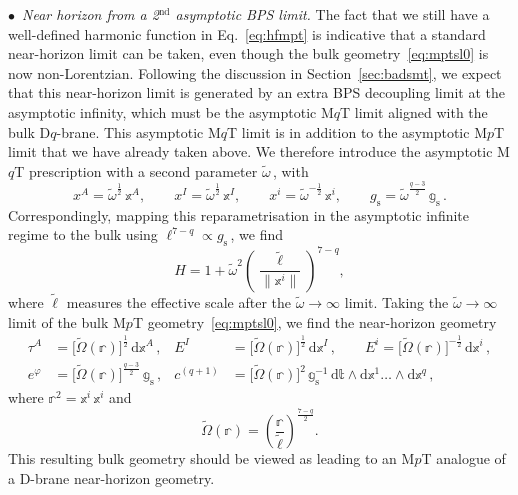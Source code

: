 \documentclass[11pt]{article}
\newcommand{\be}{\begin{equation}}
\newcommand{\ee}{\end{equation}}
\renewcommand{\tilde}[1]{\widetilde{#1}}
\renewcommand{\emph}[1]{\textit{#1}}
\newcommand{\dd}{\mathrm{d}}
\newcommand{\lbb}{\tilde{\ell}}
\begin{document}
\vspace{3mm}

\noindent $\bullet$~\emph{Near horizon from a 2${}^\text{nd}$ asymptotic BPS limit.} 
The fact that we still have a well-defined harmonic function in Eq.~\eqref{eq:hfmpt} is indicative that a standard near-horizon limit can be taken, even though the bulk geometry~\eqref{eq:mptsl0} is now non-Lorentzian. Following the discussion in Section~\ref{sec:badsmt}, we expect that this near-horizon limit is generated by an extra BPS decoupling limit at the asymptotic infinity, which must be the asymptotic M$q$T limit aligned with the bulk D$q$-brane.  
This asymptotic M$q$T limit is in addition to the asymptotic M$p$T limit that we have already taken above. We therefore introduce the asymptotic M$q$T prescription with a second parameter $\tilde{\omega}$\,, with %
\be
    x^A = \tilde{\omega}^{\frac{1}{2}} \, \mathbb{x}^A,
        \qquad%
    x^I = \tilde{\omega}^{\frac{1}{2}} \, \mathbb{x}^I,
        \qquad%
    x^i = \tilde{\omega}^{-\frac{1}{2}} \, \mathbb{x}^i,
        \qquad%
    g^{}_\text{s} = \tilde{\omega}^{\frac{q -3}{2}} \, \mathbb{g}^{}_\text{s}\,.
\ee
Correspondingly, mapping this reparametrisation in the asymptotic infinite regime to the bulk using $\ell^{7 - q} \propto g^{}_\text{s}$\,, we find
%
\be
    H = 1 + \tilde{\omega}^2 \left( \frac{\lbb}{\|\mathbb{x}^i \|} \right)^{\!7-q}\!\!,
\ee
%
where $\lbb$ measures the effective scale after the $\tilde{\omega} \rightarrow \infty$ limit. 
Taking the $\tilde{\omega} \rightarrow \infty$ limit of the bulk M$p$T geometry~\eqref{eq:mptsl0}, we find the near-horizon geometry
%
\begin{subequations} \label{eq:mptsl0NH}
\begin{align} 
    \tau^{A} & = \bigl[ \tilde{\mathbb{\Omega}} (\mathbb{r}) \bigr]^\frac{1}{2} \, \dd \mathbb{x}^A \,,
        &%
    E^{I} & = \bigl[\tilde{\mathbb{\Omega}} (\mathbb{r})\bigr]^{\frac{1}{2}} \, \dd \mathbb{x}^{I} \,,
        \qquad%
    E^{i} = \bigl[ \tilde{\mathbb{\Omega}} (\mathbb{r}) \bigr]^{-\frac{1}{2}} \, \dd \mathbb{x}^{i} \,,\\[4pt]
    e^{\varphi} & = \bigl[ \tilde{\mathbb{\Omega}} (\mathbb{r}) \bigr]^{\frac{q-3}{2}} \, \mathbb{g}_\text{s} \,,
        &%
    c^{(q+1)} & = \bigl[ \tilde{\mathbb{\Omega}}(\mathbb{r}) \bigr]^2 \, \mathbb{g}_\text{s}^{-1} \, \dd \mathbb{t} \wedge \dd \mathbb{x}^1 \dots \wedge \dd \mathbb{x}^{q} \,,
\end{align}
\end{subequations}
%
where $\mathbb{r}^2 = \mathbb{x}^i \, \mathbb{x}^i$ and
%
\be
    \tilde{\mathbb{\Omega}} (\mathbb{r}) = \left( \frac{\mathbb{r}}{\lbb} \right)^{\!\!\frac{7-q}{2}}\!\!.
\ee
%
This resulting bulk geometry should be viewed as leading to an M$p$T analogue of a D-brane near-horizon geometry. 
\end{document}
